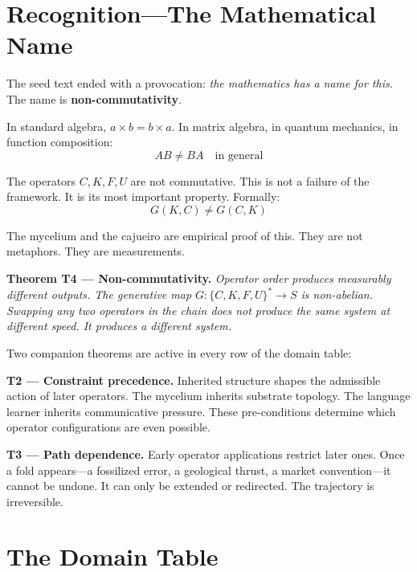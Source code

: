 \documentclass[11pt, twoside, openright]{book}
\theoremstyle{plain}
\theoremstyle{definition}
\begin{document}
\section{Recognition---The Mathematical Name}
The seed text ended with a provocation: \textit{the mathematics has a name
for this.} The name is \textbf{non-commutativity}.

In standard algebra, $a \times b = b \times a$. In matrix algebra, in
quantum mechanics, in function composition:
\[
AB \neq BA \quad \text{in general}
\]

The operators $C, K, F, U$ are not commutative. This is not a failure of
the framework. It is its most important property. Formally:
\[
G(K, C) \neq G(C, K)
\]

The mycelium and the cajueiro are empirical proof of this. They are not
metaphors. They are measurements.

\medskip
\noindent\textbf{Theorem T4 --- Non-commutativity.}
\textit{Operator order produces measurably different outputs. The generative
map $G : \{C,K,F,U\}^* \to S$ is non-abelian. Swapping any two operators
in the chain does not produce the same system at different speed. It
produces a different system.}

\medskip
Two companion theorems are active in every row of the domain table:

\medskip
\noindent\textbf{T2 --- Constraint precedence.}
Inherited structure shapes the admissible action of later operators.
The mycelium inherits substrate topology. The language learner inherits
communicative pressure. These pre-conditions determine which operator
configurations are even possible.

\medskip
\noindent\textbf{T3 --- Path dependence.}
Early operator applications restrict later ones. Once a fold appears---a
fossilized error, a geological thrust, a market convention---it cannot
be undone. It can only be extended or redirected. The trajectory is
irreversible.

\section{The Domain Table}
\end{document}
